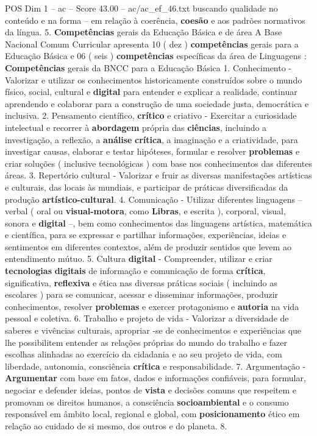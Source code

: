 \begin{textsample}{POS Dim 1 – ac – Score 43.00 – ac/ac\_ef\_46.txt}
buscando qualidade no conteúdo e na forma – em relação à coerência, \textbf{coesão} e aos padrões normativos da língua. 5. \textbf{Competências} gerais da Educação Básica e de área A Base Nacional Comum Curricular apresenta 10 ( dez ) \textbf{competências} gerais para a Educação Básica e 06 ( seis ) \textbf{competências} específicas da área de Linguagens : \textbf{Competências} gerais da BNCC para a Educação Básica 1.
Conhecimento - Valorizar e utilizar os conhecimentos historicamente construídos sobre o mundo físico, social, cultural e \textbf{digital} para entender e explicar a realidade, continuar aprendendo e colaborar para a construção de uma sociedade justa, democrática e inclusiva. 2.
Pensamento científico, \textbf{crítico} e criativo - Exercitar a curiosidade intelectual e recorrer à \textbf{abordagem} própria das \textbf{ciências}, incluindo a investigação, a reflexão, a \textbf{análise} \textbf{crítica}, a imaginação e a criatividade, para investigar causas, elaborar e testar hipóteses, formular e resolver \textbf{problemas} e criar soluções ( inclusive tecnológicas ) com base nos conhecimentos das diferentes áreas. 3.
Repertório cultural - Valorizar e fruir as diversas manifestações artísticas e culturais, das locais às mundiais, e participar de práticas diversificadas da produção \textbf{artístico-cultural}. 4.
Comunicação - Utilizar diferentes linguagens – verbal ( oral ou \textbf{visual-motora}, como \textbf{Libras}, e escrita ), corporal, visual, sonora e \textbf{digital} –, bem como conhecimentos das linguagens artística, matemática e científica, para se expressar e partilhar informações, experiências, ideias e sentimentos em diferentes contextos, além de produzir sentidos que levem ao entendimento mútuo. 5.
Cultura \textbf{digital} - Compreender, utilizar e criar \textbf{tecnologias} \textbf{digitais} de informação e comunicação de forma \textbf{crítica}, significativa, \textbf{reflexiva} e ética nas diversas práticas sociais ( incluindo as escolares ) para se comunicar, acessar e disseminar informações, produzir conhecimentos, resolver \textbf{problemas} e exercer protagonismo e \textbf{autoria} na vida pessoal e coletiva. 6.
Trabalho e projeto de vida - Valorizar a diversidade de saberes e vivências culturais, apropriar -se de conhecimentos e experiências que lhe possibilitem entender as relações próprias do mundo do trabalho e fazer escolhas alinhadas ao exercício da cidadania e ao seu projeto de vida, com liberdade, autonomia, consciência \textbf{crítica} e responsabilidade. 7.
Argumentação - \textbf{Argumentar} com base em fatos, dados e informações confiáveis, para formular, negociar e defender ideias, pontos de \textbf{vista} e decisões comuns que respeitem e promovam os direitos humanos, a consciência \textbf{socioambiental} e o consumo responsável em âmbito local, regional e global, com \textbf{posicionamento} ético em relação ao cuidado de si mesmo, dos outros e do planeta. 8.

\end{textsample}

